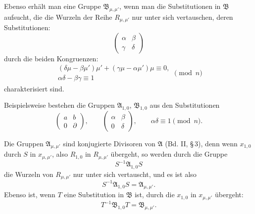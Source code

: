 \documentclass[11pt]{article}
\begin{document}
Ebenso erhält man eine Gruppe $\mathfrak B_{\mu,\mu'}$, wenn man die Substitutionen in
$\mathfrak B$ aufsucht, die die Wurzeln der Reihe $R_{\mu,\mu'}$ nur unter sich vertauschen,
deren Substitutionen:
\[
 \begin{pmatrix}\alpha&\beta\\ \gamma&\delta\end{pmatrix}
\]
durch die beiden Kongruenzen:
\begin{equation}
\begin{gathered}
 (\delta\mu-\beta\mu')\mu' + (\gamma\mu-\alpha\mu')\mu\equiv0,\\
 \alpha\delta-\beta\gamma\equiv1
\end{gathered}
\pmod n
\tag{5}
\end{equation}
charakterisiert sind.

Beispielsweise bestehen die Gruppen $\mathfrak A_{1,0}$, $\mathfrak B_{1,0}$ aus den
Substitutionen
\[
 \begin{pmatrix}a&b\\0&\partial\end{pmatrix},
 \qquad
 \begin{pmatrix}\alpha&\beta\\0&\delta\end{pmatrix},
 \qquad \alpha\delta\equiv1\pmod n.
\]

Die Gruppen $\mathfrak A_{\mu,\mu'}$ sind konjugierte Divisoren von $\mathfrak A$ (Bd. II,
\S\,3), denn wenn $x_{1,0}$ durch $S$ in $x_{\mu,\mu'}$, also $R_{1,0}$ in $R_{\mu,\mu'}$
übergeht, so werden durch die Gruppe
\[
 S^{-1}\mathfrak A_{1,0}S
\]
die Wurzeln von $R_{\mu,\mu'}$ nur unter sich vertauscht, und es ist also
\begin{equation}
 S^{-1}\mathfrak A_{1,0}S=\mathfrak A_{\mu,\mu'}.
\tag{6}
\end{equation}
Ebenso ist, wenn $T$ eine Substitution in $\mathfrak B$ ist, durch die $x_{1,0}$ in
$x_{\mu,\mu'}$ übergeht:
\begin{equation}
 T^{-1}\mathfrak B_{1,0}T=\mathfrak B_{\mu,\mu'}.
\tag{7}
\end{equation}
\end{document}
